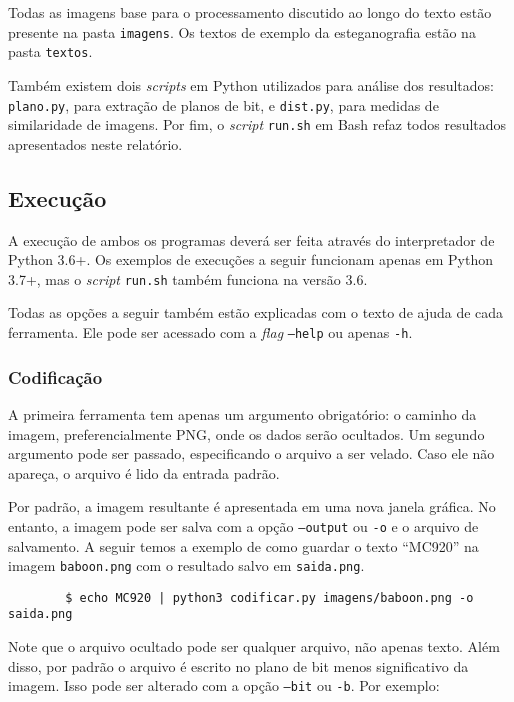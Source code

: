     Todas as imagens base para o processamento discutido ao longo do texto estão presente na pasta \texttt{imagens}. Os textos de exemplo da esteganografia estão na pasta \texttt{textos}.

    Também existem dois \textit{scripts} em Python utilizados para análise dos resultados: \texttt{plano.py}, para extração de planos de bit, e \texttt{dist.py}, para medidas de similaridade de imagens. Por fim, o \textit{script} \texttt{run.sh} em Bash refaz todos resultados apresentados neste relatório.

\subsection{Execução}

    A execução de ambos os programas deverá ser feita através do interpretador de Python 3.6+. Os exemplos de execuções a seguir funcionam apenas em Python 3.7+, mas o \textit{script} \texttt{run.sh} também funciona na versão 3.6.

    Todas as opções a seguir também estão explicadas com o texto de ajuda de cada ferramenta. Ele pode ser acessado com a \textit{flag} \texttt{--help} ou apenas \texttt{-h}.

    \subsubsection{Codificação}

    A primeira ferramenta tem apenas um argumento obrigatório: o caminho da imagem, preferencialmente PNG, onde os dados serão ocultados. Um segundo argumento pode ser passado, especificando o arquivo a ser velado. Caso ele não apareça, o arquivo é lido da entrada padrão.

    Por padrão, a imagem resultante é apresentada em uma nova janela gráfica. No entanto, a imagem pode ser salva com a opção \texttt{--output} ou \texttt{-o} e o arquivo de salvamento. A seguir temos a exemplo de como guardar o texto ``MC920'' na imagem \texttt{baboon.png} com o resultado salvo em \texttt{saida.png}.

    \begin{verbatim}
        $ echo MC920 | python3 codificar.py imagens/baboon.png -o saida.png
    \end{verbatim}

    Note que o arquivo ocultado pode ser qualquer arquivo, não apenas texto. Além disso, por padrão o arquivo é escrito no plano de bit menos significativo da imagem. Isso pode ser alterado com a opção \texttt{--bit} ou \texttt{-b}. Por exemplo:

